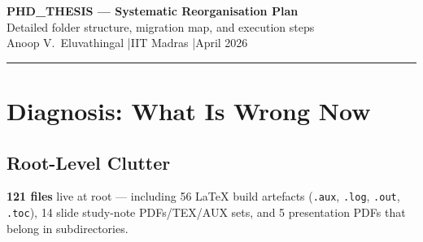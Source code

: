 \documentclass[11pt,a4paper]{article}
\begin{document}
\begin{center}
  {\LARGE\bfseries\color{sambpblue}
    PHD\_THESIS — Systematic Reorganisation Plan}\\[10pt]
  {\large Detailed folder structure, migration map, and execution steps}\\[8pt]
  {\normalsize Anoop V.\ Eluvathingal \quad|\quad IIT Madras \quad|\quad April 2026}
\end{center}

\vspace{4pt}\rule{\linewidth}{1.2pt}\vspace{6pt}

\begin{abstract}
\noindent
The current \texttt{/root/phd\_thesis} root contains \textbf{179 items}
(121 files + 58 directories) at the top level, including 56 stray LaTeX
auxiliary files (\texttt{.aux/.log/.out/.toc}), 14 slide study-note files
scattered across 14 directories, and 20+ directories with overlapping or
ambiguous purposes.
This plan defines a clean 7-folder top-level taxonomy, specifies exactly where
every existing item moves, and gives the exact shell commands to execute the
migration safely — including git operations to track the 29 currently untracked
technical reports.
\end{abstract}

\tableofcontents

\newpage
\section{Diagnosis: What Is Wrong Now}

\subsection{Root-Level Clutter}
\begin{redbox}
\textbf{121 files} live at root — including 56 LaTeX build artefacts
(\texttt{.aux}, \texttt{.log}, \texttt{.out}, \texttt{.toc}),
14 slide study-note PDFs/TEX/AUX sets, and 5 presentation PDFs that
belong in subdirectories.
\end{redbox}
\end{document}
